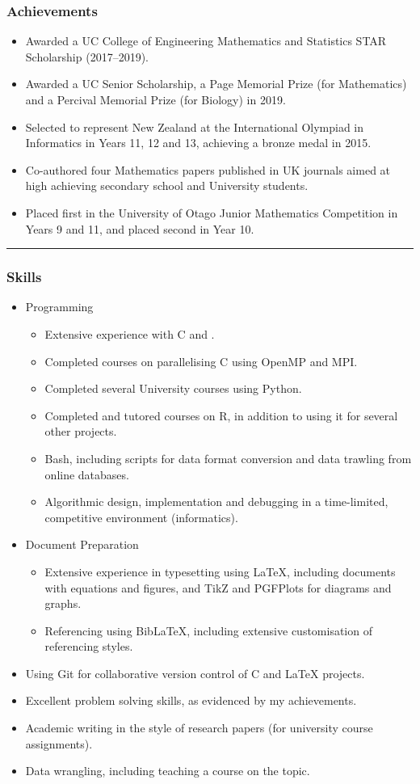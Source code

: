 \documentclass[a4paper,10pt]{article}
\begin{document}
\subsubsection*{Achievements}
\begin{itemize}
\item Awarded a UC College of Engineering Mathematics and Statistics STAR Scholarship (2017--2019).
\item Awarded a UC Senior Scholarship, a Page Memorial Prize (for Mathematics) and a Percival Memorial Prize (for Biology) in 2019.
\item Selected to represent New Zealand at the International Olympiad in Informatics in Years 11, 12 and 13, achieving a bronze medal in 2015. 
\item Co-authored four Mathematics papers published in UK journals aimed at high achieving secondary school and University students.
\item Placed first in the University of Otago Junior Mathematics Competition in Years 9 and 11, and placed second in Year 10.
\end{itemize}
\hrule

\subsubsection*{Skills}
\begin{itemize}
\item Programming
\begin{itemize}
\item Extensive experience with C and \cpluspluslogo.
\item Completed courses on parallelising C using OpenMP and MPI.
\item Completed several University courses using Python.
\item Completed and tutored courses on R, in addition to using it for several other projects.
\item Bash, including scripts for data format conversion and data trawling from online databases.
\item Algorithmic design, implementation and debugging in a time-limited, competitive environment (informatics).
\end{itemize}
\item Document Preparation
\begin{itemize}
\item Extensive experience in typesetting using LaTeX, including documents with equations and figures, and TikZ and PGFPlots for diagrams and graphs.
\item Referencing using BibLaTeX, including extensive customisation of referencing styles.
\end{itemize}
\item Using Git for collaborative version control of C and LaTeX projects.
\item Excellent problem solving skills, as evidenced by my achievements.
\item Academic writing in the style of research papers (for university course assignments).
\item Data wrangling, including teaching a course on the topic.
\end{itemize}
\end{document}
